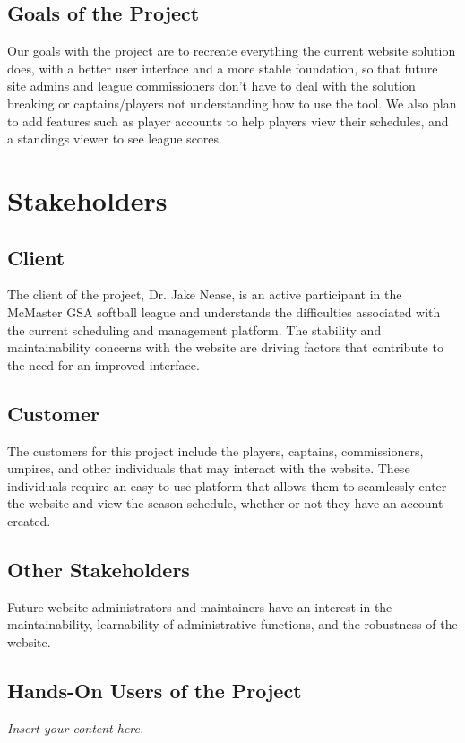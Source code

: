 \documentclass[12pt]{article}
\newcommand{\lips}{\textit{Insert your content here.}}
\begin{document}
\subsection{Goals of the Project}
Our goals with the project are to recreate everything the current website
solution does, with a better user interface and a more stable foundation, so
that future site admins and league commissioners don't have to deal with the
solution breaking or captains/players not understanding how to use the tool.
We also plan to add features such as player accounts to help players view
their schedules, and a standings viewer to see league scores.

\section{Stakeholders}
\subsection{Client}

The client of the project, Dr. Jake Nease, is an active participant in the
McMaster GSA softball league and understands the difficulties associated with
the current scheduling and management platform. The stability and maintainability
concerns with the website are driving factors that contribute to the need for
an improved interface.

\subsection{Customer}

The customers for this project include the players, captains, commissioners,
umpires, and other individuals that may interact with the website. These
individuals require an easy-to-use platform that allows them to seamlessly
enter the website and view the season schedule, whether or not they have an
account created. 

\subsection{Other Stakeholders}

Future website administrators and maintainers have an interest in the
maintainability, learnability of administrative functions, and the robustness
of the website.

\subsection{Hands-On Users of the Project}
\lips
\end{document}
